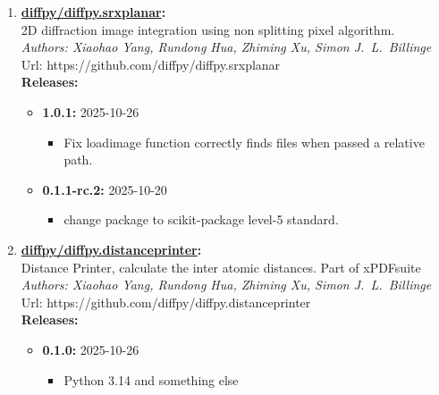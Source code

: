 \documentclass[prl,tighten,amsmath,amssymb,floatfix]{revtex4-1}
\begin{document}
\begin{enumerate}
  \item \textbf{\href{https://github.com/diffpy/diffpy.srxplanar}{diffpy/diffpy.srxplanar}:}\\
  \hspace*{1em}2D diffraction image integration using non splitting pixel algorithm.\\
  \hspace*{1em}\textit{Authors: Xiaohao Yang, Rundong Hua, Zhiming Xu, Simon J.~L.~Billinge}\\
  \hspace*{1em}Url: https://github.com/diffpy/diffpy.srxplanar\\
  \hspace*{1em}\textbf{Releases:}\vspace{-0.5em}
  \begin{itemize}[label={}]
      \item \textbf{1.0.1:} 2025-10-26
      \begin{itemize}[label={}, leftmargin=2em]
        \item Fix loadimage function correctly finds files when passed a relative path.
      \end{itemize}
      \item \textbf{0.1.1-rc.2:} 2025-10-20
      \begin{itemize}[label={}, leftmargin=2em]
        \item change package to scikit-package level-5 standard.
      \end{itemize}
  \end{itemize}

  \item \textbf{\href{https://github.com/diffpy/diffpy.distanceprinter}{diffpy/diffpy.distanceprinter}:}\\
  \hspace*{1em}Distance Printer, calculate the inter atomic distances. Part of xPDFsuite\\
  \hspace*{1em}\textit{Authors: Xiaohao Yang, Rundong Hua, Zhiming Xu, Simon J.~L.~Billinge}\\
  \hspace*{1em}Url: https://github.com/diffpy/diffpy.distanceprinter\\
  \hspace*{1em}\textbf{Releases:}\vspace{-0.5em}
  \begin{itemize}[label={}]
    \item \textbf{0.1.0:} 2025-10-26
      \begin{itemize}[label={}, leftmargin=2em]
        \item Python 3.14 and something else
      \end{itemize}
  \end{itemize}

\end{enumerate}
\end{document}

